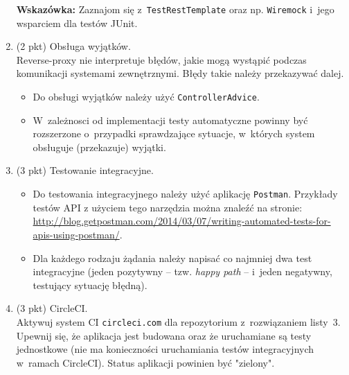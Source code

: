 \documentclass[12pt]{article}
\begin{document}
\begin{enumerate}
            \textbf{Wskazówka:} Zaznajom się z~\texttt{TestRestTemplate} oraz np. \texttt{Wiremock} i~jego wsparciem dla testów JUnit.

        \item\label{exc:spring_exception_handling}
            (2 pkt) Obsługa wyjątków.\\
            Reverse-proxy nie interpretuje błędów, jakie mogą wystąpić podczas komunikacji systemami zewnętrznymi. Błędy takie należy przekazywać dalej.
            \begin{itemize}
                \item Do obsługi wyjątków należy użyć \texttt{ControllerAdvice}.
                \item W~zależnosci od implementacji testy automatyczne powinny być rozszerzone o~przypadki sprawdzające sytuacje, w~których system obsługuje (przekazuje) wyjątki.
            \end{itemize}

        \item\label{exc:postman}
            (3 pkt) Testowanie integracyjne.
            \begin{itemize}
                \item Do testowania integracyjnego należy użyć aplikację \texttt{Postman}. Przykłady testów API z użyciem tego narzędzia można znaleźć na stronie: \\\url{http://blog.getpostman.com/2014/03/07/writing-automated-tests-for-apis-using-postman/}.
                \item Dla każdego rodzaju żądania należy napisać co najmniej dwa test integracyjne (jeden pozytywny -- tzw. \emph{happy path} -- i~jeden negatywny, testujący sytuację błędną).
            \end{itemize}

        \item\label{exc:travis}
            (3 pkt) CircleCI.\\
            Aktywuj system CI \texttt{circleci.com} dla repozytorium z~rozwiązaniem listy~3. Upewnij się, że aplikacja jest budowana oraz że uruchamiane są testy jednostkowe (nie ma konieczności uruchamiania testów integracyjnych w~ramach CircleCI). Status aplikacji powinien być "zielony".
    \end{enumerate}
\end{document}
